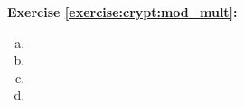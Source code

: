 \noindent\textbf{Exercise \ref{exercise:crypt:mod_mult}:}
\begin{multicols}{2}
\begin{enumerate}[(a)]
\item

\item

\item

\item
\end{enumerate}
\end{multicols}


